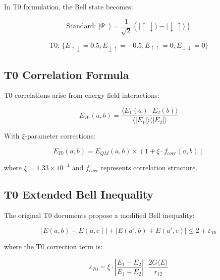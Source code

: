 \documentclass[12pt,a4paper]{article}
\newcommand{\Efield}{E}
\newcommand{\xipar}{\xi}
\begin{document}
	In T0 formulation, the Bell state becomes:
	
	\begin{equation}
		\text{Standard: } |\Psi^-\rangle = \frac{1}{\sqrt{2}}(|\uparrow\downarrow\rangle - |\downarrow\uparrow\rangle)
	\end{equation}
	
	\begin{equation}
		\text{T0: } \{\Efield_{\uparrow\downarrow} = 0.5, \Efield_{\downarrow\uparrow} = -0.5, \Efield_{\uparrow\uparrow} = 0, \Efield_{\downarrow\downarrow} = 0\}
	\end{equation}
	
	\subsection{T0 Correlation Formula}
	
	T0 correlations arise from energy field interactions:
	
	\begin{equation}
		E_{T0}(a,b) = \frac{\langle \Efield_1(a) \cdot \Efield_2(b) \rangle}{\langle |\Efield_1| \rangle \langle |\Efield_2| \rangle}
	\end{equation}
	
	With $\xipar$-parameter corrections:
	
	\begin{equation}
		E_{T0}(a,b) = E_{QM}(a,b) \times (1 + \xipar \cdot f_{corr}(a,b))
	\end{equation}
	
	where $\xipar = 1.33 \times 10^{-4}$ and $f_{corr}$ represents correlation structure.
	
	\subsection{T0 Extended Bell Inequality}
	
	The original T0 documents propose a modified Bell inequality:
	
	\begin{equation}
		|E(a,b) - E(a,c)| + |E(a',b) + E(a',c)| \leq 2 + \varepsilon_{T0}
	\end{equation}
	
	where the T0 correction term is:
	
	\begin{equation}
		\varepsilon_{T0} = \xipar \cdot \left|\frac{E_1 - E_2}{E_1 + E_2}\right| \cdot \frac{2G\langle E \rangle}{r_{12}}
	\end{equation}
	
\end{document}
